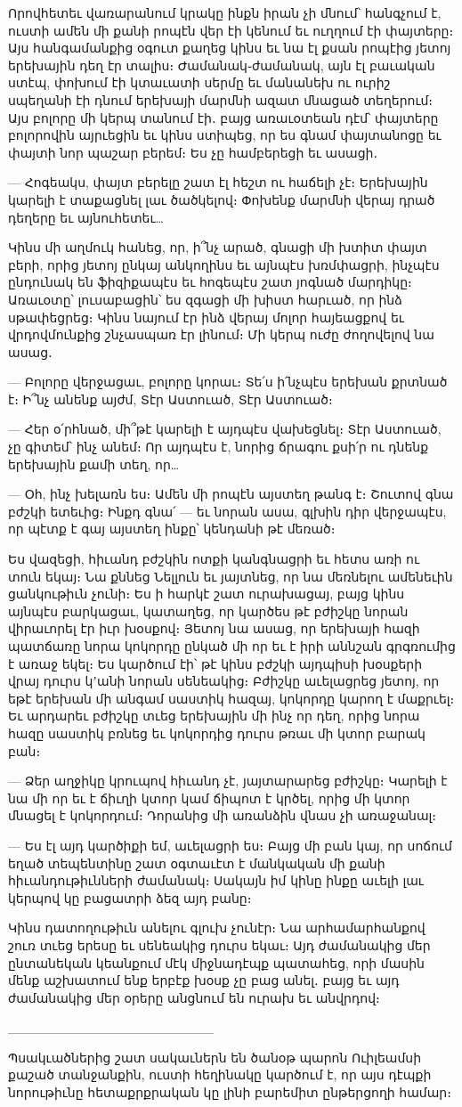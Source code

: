Որովհետեւ վառարանում կրակը ինքն իրան չի մնում՝ հանգչում է, ուստի ամեն մի քանի րոպէն վեր էի կենում եւ ուղղում էի փայտերը։ Այս հանգամանքից օգուտ քաղեց կինս եւ նա էլ քսան րոպէից յետոյ երեխային դեղ էր տալիս։ Ժամանակ֊ժամանակ, այն էլ բաւական ստէպ, փոխում էի կտաւատի սերմը եւ մանանեխ ու ուրիշ սպեղանի էի դնում երեխայի մարմնի ազատ մնացած տեղերում։ Այս բոլորը մի կերպ տանում էի․ բայց առաւօտեան դէմ՝ փայտերը բոլորովին այրւեցին եւ կինս ստիպեց, որ ես գնամ փայտանոցը եւ փայտի նոր պաշար բերեմ։ Ես չը համբերեցի եւ ասացի․

— Հոգեակս, փայտ բերելը շատ էլ հեշտ ու հաճելի չէ։ Երեխային կարելի է տաքացնել լաւ ծածկելով։ Փոխենք մարմնի վերայ դրած դեղերը եւ այնուհետեւ…

Կինս մի աղմուկ հանեց, որ, ի՞նչ արած, գնացի մի խտիտ փայտ բերի, որից յետոյ ընկայ անկողինս եւ այնպէս խռմփացրի, ինչպէս ընդունակ են ֆիզիքապէս եւ հոգեպէս շատ յոգնած մարդիկը։ Առաւօտը՝ լուսաբացին՝ ես զգացի մի խիստ հարւած, որ ինձ սթափեցրեց։ Կինս նայում էր ինձ վերայ մոլոր հայեացքով եւ վրդովմունքից շնչասպառ էր լինում։ Մի կերպ ուժը ժողովելով նա ասաց․

— Բոլորը վերջացաւ, բոլորը կորաւ։ Տե՛ս ի՛նչպէս երեխան քրտնած է։ Ի՞նչ անենք այժմ, Տէր Աստուած, Տէր Աստուած։

— Հեր օ՛րհնած, մի՞թէ կարելի է այդպէս վախեցնել։ Տէր Աստուած, չը գիտեմ՝ ինչ անեմ։ Որ այդպէս է, նորից ճրագու քսի՛ր ու դնենք երեխային քամի տեղ, որ…

— Օհ, ինչ խելառն ես։ Ամեն մի րոպէն այստեղ թանգ է։ Շուտով գնա բժշկի ետեւից։ Ինքդ գնա՛ — եւ նորան ասա, գլխին դիր վերջապէս, որ պէտք է գայ այստեղ ինքը՝ կենդանի թէ մեռած։

Ես վազեցի, հիւանդ բժշկին ոտքի կանգնացրի եւ հետս առի ու տուն եկայ։ Նա քննեց Նելլուն եւ յայտնեց, որ նա մեռնելու ամենեւին ցանկութիւն չունի։ Ես ի հարկէ շատ ուրախացայ, բայց կինս այնպէս բարկացաւ, կատաղեց, որ կարծես թէ բժիշկը նորան վիրաւորել էր իւր խօսքով։ Յետոյ նա ասաց, որ երեխայի հազի պատճառը նորա կոկորդը ընկած մի որ եւ է իրի աննշան գրգռումից է առաջ եկել։ Ես կարծում էի՝ թէ կինս բժշկի այդպիսի խօսքերի վրայ դուրս կʼանի նորան սենեակից։ Բժիշկը աւելացրեց յետոյ, որ եթէ երեխան մի անգամ սաստիկ հազայ, կոկորդը կարող է մաքրւել։ Եւ արդարեւ բժիշկը տւեց երեխային մի ինչ որ դեղ, որից նորա հազը սաստիկ բռնեց եւ կոկորդից դուրս թռաւ մի կտոր բարակ բան։

— Ձեր աղջիկը կրուպով հիւանդ չէ, յայտարարեց բժիշկը։ Կարելի է նա մի որ եւ է ճիւղի կտոր կամ ճիպոտ է կրծել, որից մի կտոր մնացել է կոկորդում։ Դորանից մի առանձին վնաս չի առաջանալ։

— Ես էլ այդ կարծիքի եմ, աւելացրի ես։ Բայց մի բան կայ, որ սոճում եղած տեպենտինը շատ օգտաւէտ է մանկական մի քանի հիւանդութիւնների ժամանակ։ Սակայն իմ կինը ինքը աւելի լաւ կերպով կը բացատրի ձեզ այդ բանը։

Կինս դատողութիւն անելու գլուխ չունէր։ Նա արհամարհանքով շուռ տւեց երեսը եւ սենեակից դուրս եկաւ։ Այդ ժամանակից մեր ընտանեկան կեանքում մէկ միջնադէպք պատահեց, որի մասին մենք աշխատում ենք երբէք խօսք չը բաց անել․ բայց եւ այդ ժամանակից մեր օրերը անցնում են ուրախ եւ անվրդով։

______________________

Պսակւածներից շատ սակաւներն են ծանօթ պարոն Ուիլեամսի քաշած տանջանքին, ուստի հեղինակը կարծում է, որ այս դէպքի նորութիւնը հետաքրքրական կը լինի բարեմիտ ընթերցողի համար։ 

\bye
